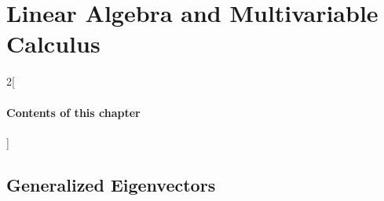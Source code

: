 \chapter{Linear Algebra and Multivariable Calculus}

\begin{multicols}{2}[\subsubsection*{Contents of this chapter}]
\end{multicols}







\section{Generalized Eigenvectors}










\chapauthor{}
